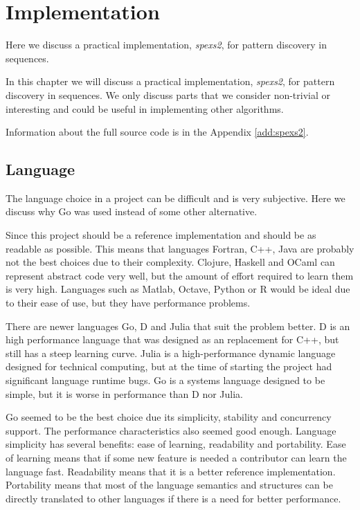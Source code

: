 \chapter{Implementation}
\label{c:implementation}

Here we discuss a practical implementation, \emph{spexs2}, for
pattern discovery in sequences. 

In this chapter we will discuss a practical implementation, \emph{spexs2}, for pattern discovery in sequences. We only discuss parts that we consider non-trivial or interesting and could be useful in implementing other algorithms.

Information about the full source code is in the Appendix \ref{add:spexs2}.

\section{Language}

The language choice in a project can be difficult and is very subjective. Here we discuss why Go was used instead of some other alternative.

Since this project should be a reference implementation and should be as readable as possible. This means that languages Fortran, C++, Java are probably not the best choices due to their complexity. Clojure, Haskell and OCaml can represent abstract code very well, but the amount of effort required to learn them is very high. Languages such as Matlab, Octave, Python or R would be ideal due to their ease of use, but they have performance problems\insertref{}.

There are newer languages Go, D and Julia that suit the problem better. D is an high performance language that was designed as an replacement for C++, but still has a steep learning curve. Julia is a high-performance dynamic language designed for technical computing, but at the time of starting the project had significant language runtime bugs. Go is a systems language designed to be simple, but it is worse in performance than D nor Julia.

Go seemed to be the best choice due its simplicity, stability and concurrency support. The performance characteristics also seemed good enough. Language simplicity has several benefits: ease of learning, readability and portability. Ease of learning means that if some new feature is needed a contributor can learn the language fast. Readability means that it is a better reference implementation. Portability means that most of the language semantics and structures can be directly translated to other languages if there is a need for better performance.

